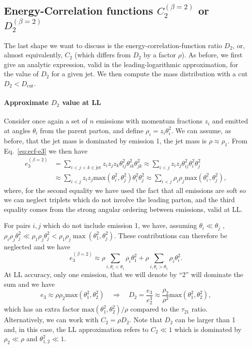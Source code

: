 \subsection{Energy-Correlation functions $C_2^{(\beta=2)}$ or $D_2^{(\beta=2)}$}

The last shape we want to discuss is the energy-correlation-function
ratio $D_2$, or, almost equivalently, $C_2$ (which differs from $D_2$
by a factor $\rho$).
%
As before, we first give an analytic expression, valid in the
leading-logarithmic approximation, for the value of $D_2$ for a given
jet. We then compute the mass distribution with a cut
$D_2<D_\text{cut}$.

\paragraph{Approximate $D_2$ value at LL}
%
Consider once again a set of $n$ emissions with momentum fractions
$z_i$ and emitted at angles $\theta_i$ from the parent parton, and
define $\rho_i=z_i\theta_i^2$.
%
We can assume, as before, that the jet mass is dominated by emission
1, \ie the jet mass is $\rho\approx\rho_1$.
%
From Eq.~\eqref{eq:ecf-e3} we then have
\begin{align}
  e_3^{(\beta=2)}
  & = \sum_{i<j<k\in\text{jet}} z_i z_j z_k
      \theta_{ij}^2 \theta_{ik}^2 \theta_{jk}^2
    \approx \sum_{i<j} z_i z_j
      \theta_{ij}^2 \theta_i^2 \theta_j^2\\
  & \approx \sum_{i<j} z_i z_j
      \text{max}(\theta_i^2,\theta_j^2) \theta_i^2 \theta_j^2
    \approx \sum_{i<j} \rho_i \rho_j
      \text{max}(\theta_i^2,\theta_j^2),
\end{align}
where, for the second equality we have used the fact that all
emissions are soft so we can neglect triplets which do not involve the
leading parton, and the third equality comes from the strong angular
ordering between emissions, valid at LL.

For pairs $i,j$ which do not include emission 1, we have, assuming
$\theta_i\ll \theta_j$ , $\rho_i \rho_j \theta_j^2\ll \rho_1 \rho_j
\theta_j^2< \rho_1 \rho_j
\max(\theta_1^2,\theta_j^2)$. These contributions can therefore be
neglected and we have
\begin{equation}
  e_3^{(\beta=2)}
  \approx \rho \sum_{i,\theta_i<\theta_1} \rho_i \theta_1^2 + \rho \sum_{i,\theta_i>\theta_1} \rho_i \theta_i^2.
\end{equation}
At LL accuracy, only one emission, that we will denote by ``2'' will
dominate the sum and we have
\begin{equation}
  e_3 \approx \rho \rho_2 \text{max}(\theta_1^2,\theta_2^2)
  \quad \Rightarrow \quad
  D_2 = \frac{e_3}{e_2^3} \approx \frac{\rho_2}{\rho^2} \text{max}(\theta_1^2,\theta_2^2),
\end{equation}
which has an extra factor $\text{max}(\theta_1^2,\theta_2^2)/\rho$
compared to the $\tau_{21}$ ratio. Alternatively, we can work with
$C_2=\rho D_2$.
%
Note that $D_2$ can be larger than 1 and, in this case, the LL
approximation refers to $C_2\ll 1$ which is dominated by
$\rho_2\ll \rho$ and $\theta_{1,2}^2\ll 1$.

